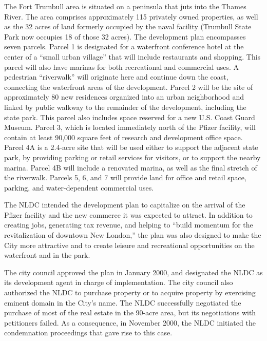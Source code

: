 The Fort Trumbull area is situated on a peninsula that juts into the Thames
River. The area comprises approximately 115 privately owned properties, as well
as the 32 acres of land formerly occupied by the naval facility (Trumbull State
Park now occupies 18 of those 32 acres). The development plan encompasses seven
parcels. Parcel 1 is designated for a waterfront conference hotel at the center
of a ``small urban village'' that will include restaurants and shopping. This
parcel will also have marinas for both recreational and commercial uses. A
pedestrian ``riverwalk'' will originate here and continue down the coast,
connecting the waterfront areas of the development. Parcel 2 will be the site of
approximately 80 new residences organized into an urban neighborhood and linked
by public walkway to the remainder of the development, including the state park.
This parcel also includes space reserved for a new U.S. Coast Guard Museum.
Parcel 3, which is located immediately north of the Pfizer facility, will
contain at least 90,000 square feet of research and development office space.
Parcel 4A is a 2.4-acre site that will be used either to support the adjacent
state park, by providing parking or retail services for visitors, or to support
the nearby marina. Parcel 4B will include a renovated marina, as well as the
final stretch of the riverwalk. Parcels 5, 6, and 7 will provide land for office
and retail space, parking, and water-dependent commercial uses. 

The NLDC intended the development plan to capitalize on the arrival of the
Pfizer facility and the new commerce it was expected to attract. In addition to
creating jobs, generating tax revenue, and helping to ``build momentum for the
revitalization of downtown New London,'' the plan was also designed to make the
City more attractive and to create leisure and recreational opportunities on the
waterfront and in the park.

The city council approved the plan in January 2000, and designated the NLDC as
its development agent in charge of implementation. The city council also
authorized the NLDC to purchase property or to acquire property by exercising
eminent domain in the City's name. The NLDC successfully negotiated the purchase
of most of the real estate in the 90-acre area, but its negotiations with
petitioners failed. As a consequence, in November 2000, the NLDC initiated the
condemnation proceedings that gave rise to this case.




